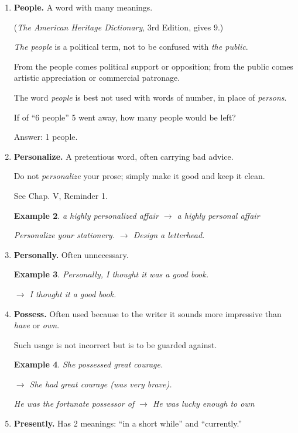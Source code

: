 \documentclass{book}
\numberwithin{equation}{section}
\newtheorem{example}{Example}[chapter]
\begin{document}
\begin{enumerate}
\begin{example}
        $\to$ There was great dissatisfaction with the arbitrators' decision in favor of the company.
    \end{example}
    \item \textbf{People.} A word with many meanings.
    
    (\textit{The American Heritage Dictionary}, 3rd Edition, gives 9.)
    
    \textit{The people} is a political term, not to be confused with \textit{the public}.
    
    From the people comes political support or opposition; from the public comes artistic appreciation or commercial patronage.
    
    The word \textit{people} is best not used with words of number, in place of \textit{persons}.
    
    If of ``6 people'' 5 went away, how many people would be left?
    
    Answer: 1 people.
    \item \textbf{Personalize.} A pretentious word, often carrying bad advice.
    
    Do not \textit{personalize} your prose; simply make it good and keep it clean.
    
    See Chap. V, Reminder 1.
    \begin{example}
        a highly personalized affair $\to$ a highly personal affair
        
        Personalize your stationery. $\to$ Design a letterhead.
    \end{example}
    \item \textbf{Personally.} Often unnecessary.
    \begin{example}
        Personally, I thought it was a good book.
        
        $\to$ I thought it a good book.
    \end{example}
    \item \textbf{Possess.} Often used because to the writer it sounds more impressive than \textit{have} or \textit{own}.
    
    Such usage is not incorrect but is to be guarded against.
    \begin{example}
        She possessed great courage.
        
        $\to$ She had great courage (was very brave).
        
        He was the fortunate possessor of $\to$ He was lucky enough to own
    \end{example}
    \item \textbf{Presently.} Has 2 meanings: ``in a short while'' and ``currently.''
    

\end{enumerate}
\end{document}
